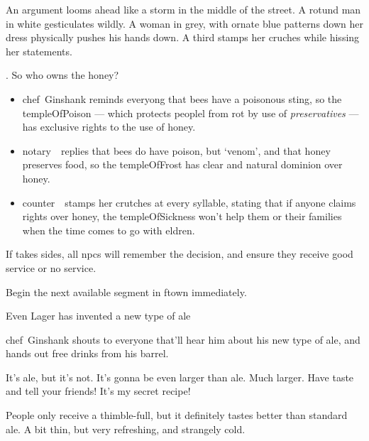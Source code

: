 \begin{boxtext}
  An argument looms ahead like a storm in the middle of the street.
  A rotund man in white gesticulates wildly.
  A woman in grey, with ornate blue patterns down her dress physically pushes his hands down.
  A third stamps her cruches while hissing her statements.
\end{boxtext}

.
So who owns the honey?

\begin{itemize}
  \item
  \Gls{chef}~Ginshank reminds everyong that bees have a poisonous sting, so the \gls{templeOfPoison} --- which protects peoplel from rot by use of \emph{preservatives} --- has exclusive rights to the use of honey.
  \item
  \Gls{notary}~\composeHumanName\ replies that bees do have poison, but `venom', and that honey preserves food, so the \gls{templeOfFrost} has clear and natural dominion over honey.
  \item
  \Gls{counter}~\composeHumanName\ stamps her crutches at every syllable, stating that if anyone claims rights over honey, the \gls{templeOfSickness} won't help them or their families when the time comes to go with \gls{eldren}.
\end{itemize}

If  takes sides, all \glspl{npc} will remember the decision, and ensure they receive good service or no service.

Begin the next available \gls{segment} in \gls{ftown} immediately.

{Even Lager}%
{ has invented a new type of ale}%

\Gls{chef}~Ginshank shouts to everyone that'll hear him about his new type of ale, and hands out free drinks from his barrel.

\begin{speechtext}
  It's ale, but it's not.
  It's gonna be even larger than ale.
  Much larger.
  Have taste and tell your friends!
  It's my secret recipe!
\end{speechtext}

People only receive a thimble-full, but it definitely tastes better than standard ale.
A bit thin, but very refreshing, and strangely cold.


